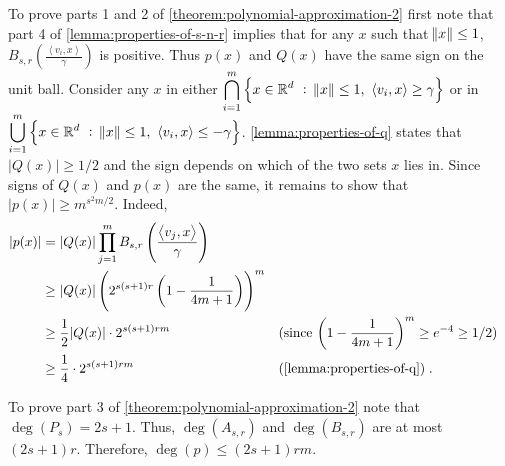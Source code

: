 \documentclass[12pt]{article}
\newcommand{\R}{\mathbb{R}}  %
\newcommand{\ip}[2]{\left\langle #1, #2 \right\rangle} %
\begin{document}
To prove parts 1 and 2 of \autoref{theorem:polynomial-approximation-2} first
note that part 4 of \autoref{lemma:properties-of-s-n-r} implies that for any $x$
such that $\norm{x} \le 1$, $B_{s,r}\left( \frac{\ip{v_i}{x}}{\gamma} \right)$
is positive. Thus $p(x)$ and $Q(x)$ have the same sign on the unit ball.
Consider any $x$ in either
$\displaystyle \bigcap_{i=1}^m \left\{ x \in \R^d ~:~ \norm{x} \le 1, \ \ip{v_i}{x} \ge \gamma \right\}$
or in
$\displaystyle \bigcup_{i=1}^m \left\{ x \in \R^d ~:~ \norm{x} \le 1, \ \ip{v_i}{x} \le - \gamma \right\}$.
\autoref{lemma:properties-of-q} states that $|Q(x)| \ge 1/2$ and the sign
depends on which of the two sets $x$ lies in. Since signs of $Q(x)$ and $p(x)$
are the same, it remains to show that $|p(x)| \ge m^{s^2m/2}$. Indeed,
\begin{align*}
|p(x)|
& = |Q(x)| \prod_{j=1}^m B_{s,r} \left( \frac{\ip{v_j}{x}}{\gamma} \right) \\
& \ge |Q(x)| \left( 2^{s(s+1)r} \left( 1 - \frac{1}{4m+1} \right) \right)^m \\
& \ge \frac{1}{2} |Q(x)| \cdot 2^{s(s+1)rm} && \text{(since $\left(1-\frac{1}{4m+1}\right)^m \ge e^{-4} \ge 1/2$)} \\
& \ge \frac{1}{4} \cdot 2^{s(s+1)rm} && \text{(\autoref{lemma:properties-of-q})} \; .
\end{align*}

To prove part 3 of \autoref{theorem:polynomial-approximation-2} note that
$\deg(P_s) = 2s+1$. Thus, $\deg(A_{s,r})$ and $\deg(B_{s,r})$ are at most
$(2s+1)r$. Therefore, $\deg(p) \le (2s+1) rm$.
\end{document}
